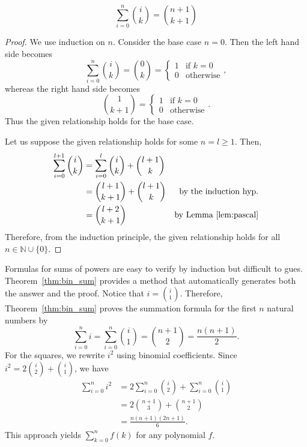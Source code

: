 \documentclass[../main.tex]{subfiles}
\begin{document}
\begin{thm}  \label{thm:bin_sum}
    \[
        \sum_{i=0}^n {i \choose k} = {n + 1 \choose k + 1}
    \]
\end{thm}
\begin{proof}
    We use induction on $n$.
    Consider the base case $n = 0$.
    Then the left hand side becomes
    \[
        \sum_{i=0}^n {i \choose k} = {0 \choose k} = \begin{cases}
            1 &\text{if } k = 0\\
            0 &\text{otherwise}
        \end{cases},
    \]
    whereas the right hand side becomes
    \[
        {1 \choose k + 1} = \begin{cases}
            1 &\text{if } k = 0\\
            0 &\text{otherwise}
        \end{cases}.
    \]
    Thus the given relationship holds for the base case.

    Let us suppose the given relationship holds for some $n = l \geq 1$.
    Then, 
    \begin{align*}
        \sum_{i=0}^{l+1} {i \choose k} &= \sum_{i=0}^l {i \choose k} + {l+1 \choose k}\\
                                       &= {l + 1 \choose k + 1} + {l + 1 \choose k} &\text{by the induction hyp.}\\
                                       &= {l + 2 \choose k + 1} &\text{by Lemma~\ref{lem:pascal}}
    \end{align*}
    Therefore, from the induction principle, the given relationship holds for all $n \in \mathbb{N} \cup \{0\}$.
\end{proof}

\begin{ex} 
    Formulas for sums of powers are easy to verify by induction but difficult to gues.
    Theorem~\ref{thm:bin_sum} provides a method that automatically generates both the answer and the proof.
    Notice that $i = {i \choose 1}$.
    Therefore, Theorem~\ref{thm:bin_sum} proves the summation formula for the first $n$ natural numbers by 
    \[
        \sum_{i=0}^n i = \sum_{i=0}^n {i \choose 1} = {n + 1 \choose 2} = \frac{n(n+1)}{2}.
    \]
    For the squares, we rewrite $i^2$ using binomial coefficients.
    Since $i^2 = 2 {i \choose 2} + {i \choose 1}$, we have
    \begin{align*}
        \sum_{i=0}^n i^2 &= 2 \sum_{i=0}^n {i \choose 2} + \sum_{i=0}^n {i \choose 1}\\
                         &= 2 {n+1 \choose 3} + {n+1 \choose 2}\\
                         &= \frac{n(n+1)(2n+1)}{6}.
    \end{align*}
    This approach yields $\sum_{k=0}^n f(k)$ for any polynomial $f$.
\end{ex}
\end{document}
